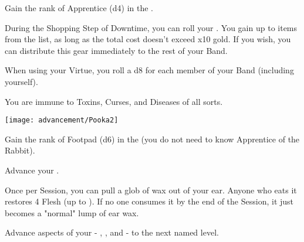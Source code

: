 \begin{multicols*}{2}



Gain the rank of Apprentice (d4) in the .


During the Shopping Step of Downtime, you can roll your \LUCK. You gain up to \SUM items from the  list, as long as the total cost doesn't exceed \SUM x10 gold.  If you wish, you can distribute this gear immediately to the rest of your Band.


When using your  Virtue, you roll a d8 for each member of your Band (including yourself).

\cbreak



You are immune to Toxins, Curses, and Diseases of all sorts.


\begin{center}
\texttt{[image: advancement/Pooka2]}
\end{center}

\newpage


Gain the rank of Footpad (d6) in the  (you do not need to know Apprentice of the Rabbit).


Advance your  \DCUP.


Once per Session, you can pull a glob of wax out of your ear.  Anyone who eats it restores 4 Flesh (up to \MAX). If no one consumes it by the end of the Session, it just becomes a "normal" lump of ear wax.


Advance  aspects of your  - \DEATH, \INJURY, and \INSANITY - to the next named level.



\end{multicols*}

